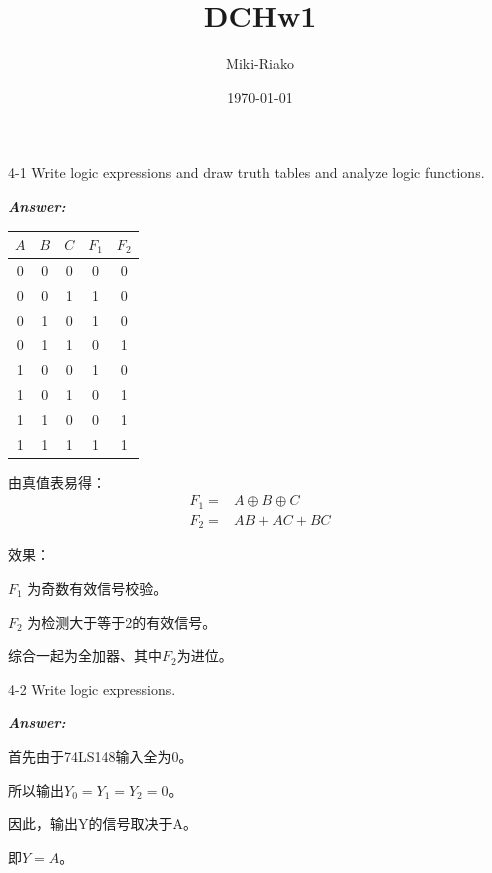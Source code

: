 \documentclass[12pt]{article}
\title{DCHw1}
\author{Miki-Riako }
\date{\today}
\newenvironment{Answer}{
  \vspace{12pt}
  {\large\textbf{\textit{\hspace{-12pt}Answer:}}}\par
  \vspace{8pt}
} {\vspace{24pt}}
\begin{document}
\begin{question}{}{}
  4-1 Write logic expressions and draw truth tables and analyze logic functions.
\end{question}
\begin{Answer}
\noindent\begin{minipage}{0.5\textwidth}
\begin{center}\begin{tabular}{|c|c|c|c|c|}\hline
$A$ & $B$ & $C$ & $F_1$ & $F_2$ \\ \hline
0 & 0 & 0 & 0 & 0 \\ \hline
0 & 0 & 1 & 1 & 0 \\ \hline
0 & 1 & 0 & 1 & 0 \\ \hline
0 & 1 & 1 & 0 & 1 \\ \hline
1 & 0 & 0 & 1 & 0 \\ \hline
1 & 0 & 1 & 0 & 1 \\ \hline
1 & 1 & 0 & 0 & 1 \\ \hline
1 & 1 & 1 & 1 & 1 \\ \hline
\end{tabular}\end{center}
\end{minipage}\begin{minipage}{0.5\textwidth}
由真值表易得：
\begin{align*}
  F_1=&A\oplus B\oplus C \\
  F_2=&AB+AC+BC
\end{align*}

效果：\newline

$F_1$ 为奇数有效信号校验。

$F_2$ 为检测大于等于2的有效信号。

综合一起为全加器、其中$F_2$为进位。
\end{minipage}
\end{Answer}

\begin{question}{}{}
  4-2 Write logic expressions.
\end{question}
\begin{Answer}
首先由于74LS148输入全为0。

所以输出$Y_0=Y_1=Y_2=0$。

因此，输出Y的信号取决于A。

即$Y=A$。
\end{Answer}
\end{document}
